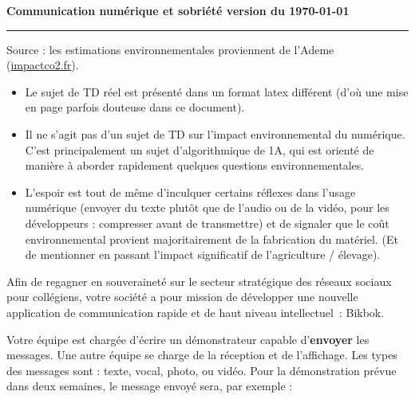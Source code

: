 

\begin{center}
  \Large\bf Communication numérique et sobriété \ifclimasup version du \today\fi
\end{center}

\noindent\rule{\linewidth}{.6pt}

\bigskip

Source : les estimations environnementales proviennent de l'Ademe (\url{impactco2.fr}).

\ifclimasup
{}
\begin{itemize}
\item Le sujet de TD réel est présenté dans un format latex différent (d'où une mise en page parfois douteuse dans ce document).
\item Il ne s'agit pas d'un sujet de TD sur l'impact environnemental du numérique. C'est principalement un sujet d'algorithmique de 1A, qui est orienté de manière à aborder rapidement quelques questions environnementales.
\item L'espoir est tout de même d'inculquer certains réflexes dans l'usage numérique (envoyer du texte plutôt que de l'audio ou de la vidéo, pour les développeurs : compresser avant de transmettre)
et de signaler que le coût environnemental provient majoritairement de la fabrication du matériel. (Et de mentionner en passant l'impact significatif de l'agriculture / élevage).
\end{itemize}
\fi


Afin de regagner en souveraineté sur le secteur stratégique des réseaux sociaux pour collégiens, votre société a pour mission de développer une nouvelle application de communication rapide et
de haut niveau intellectuel~: Bikbok.
\medskip

Votre équipe est chargée d'écrire un démonstrateur capable d'\textbf{envoyer} les messages. Une autre équipe se charge de la réception et de l'affichage. Les types des messages sont :
texte, vocal, photo, ou vidéo.
Pour la démonstration prévue dans deux semaines, le message envoyé sera, par exemple :

